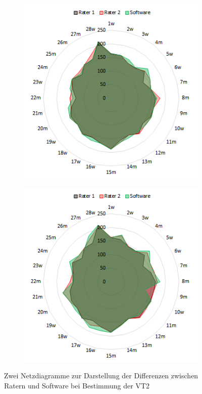 \begin{figure}[H]
	\centering
	\begin{subfigure}[c]{0.45\textwidth}
		\centering
		\includegraphics[scale=0.73]{Bilder/eqco2_net}
		\label{subpic:pic3}
	\end{subfigure}%
	\hfil
	\begin{subfigure}[c]{0.45\textwidth}
		\centering
		\includegraphics[scale=0.73]{Bilder/ve_vco2_net}
		\label{subpic:pic4}
	\end{subfigure}
	\caption[Netzdiagramme zur Darstellung der Differenzen für VT2]{Zwei Netzdiagramme zur Darstellung der Differenzen zwischen Ratern und Software bei Bestimmung der VT2}
	\label{pic:pic25}
\end{figure}

